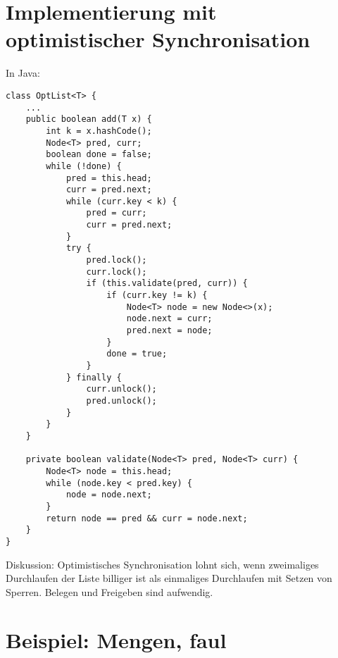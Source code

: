 \section{Implementierung mit optimistischer Synchronisation}

In Java:
\begin{lstlisting}
class OptList<T> {
	...
	public boolean add(T x) {
		int k = x.hashCode();
		Node<T> pred, curr;
		boolean done = false;
		while (!done) {
			pred = this.head;
			curr = pred.next;
			while (curr.key < k) {
				pred = curr;
				curr = pred.next;
			}
			try {
				pred.lock();
				curr.lock();
				if (this.validate(pred, curr)) {
					if (curr.key != k) {
						Node<T> node = new Node<>(x);
						node.next = curr;
						pred.next = node;
					}
					done = true;
				}
			} finally {
				curr.unlock();
				pred.unlock();
			}
		}
	}
	
	private boolean validate(Node<T> pred, Node<T> curr) {
		Node<T> node = this.head;
		while (node.key < pred.key) {
			node = node.next;
		}
		return node == pred && curr = node.next;
	}
}
\end{lstlisting}
Diskussion: Optimistisches Synchronisation lohnt sich, wenn zweimaliges Durchlaufen der Liste billiger ist als einmaliges Durchlaufen mit Setzen von Sperren. Belegen und Freigeben sind aufwendig.

\section{Beispiel: Mengen, faul}